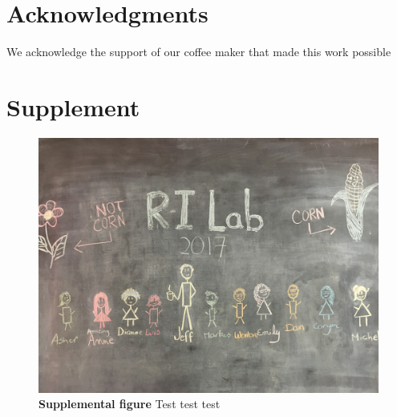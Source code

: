 \documentclass[article,9pt,twocolumn,twoside]{rilabRxiv}
\newcommand{\beginsupplement}{%
        \setcounter{table}{0}
        \renewcommand{\thetable}{S\arabic{table}}%
        \setcounter{figure}{0}
        \renewcommand{\thefigure}{S\arabic{figure}}%
     }
\begin{document}
\section{Acknowledgments}
We acknowledge the support of our coffee maker that made this work possible



\onecolumn
\section*{Supplement}



\beginsupplement


\blindtext
\begin{figure}[h!]
\includegraphics[width=.9\linewidth]{figures/lab_group.png}
\caption{\textbf{Supplemental figure} Test test test}
\label{fig:S1}
\end{figure}
\pagebreak
\end{document}
